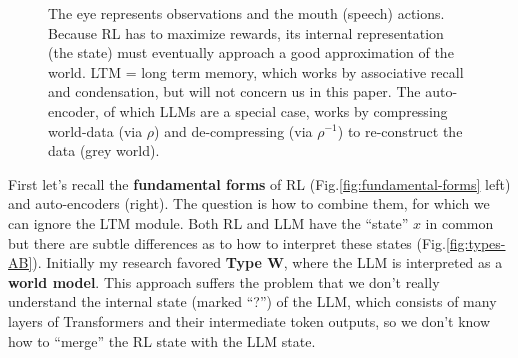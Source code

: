 \documentclass[runningheads]{llncs}
\begin{document}
\begin{figure}
\caption{The eye represents observations and the mouth (speech) actions.  Because RL has to maximize rewards, its internal representation (the state) must eventually approach a good approximation of the world.  LTM = long term memory, which works by associative recall and condensation, but will not concern us in this paper.  The auto-encoder, of which LLMs are a special case, works by compressing world-data (via $\rho$) and de-compressing (via $\rho^{-1}$) to re-construct the data (grey world).}
\end{figure}

First let's recall the \textbf{fundamental forms} of RL (Fig.\ref{fig:fundamental-forms} left) and auto-encoders (right).  The question is how to combine them, for which we can ignore the LTM module. Both RL and LLM have the ``state'' $x$ in common but there are subtle differences as to how to interpret these states (Fig.\ref{fig:types-AB}).  Initially my research favored \textbf{Type W}, where the LLM is interpreted as a \textbf{world model}.  This approach suffers the problem that we don't really understand the internal state (marked ``?'') of the LLM, which consists of many layers of Transformers and their intermediate token outputs, so we don't know how to ``merge'' the RL state with the LLM state.
\end{document}
